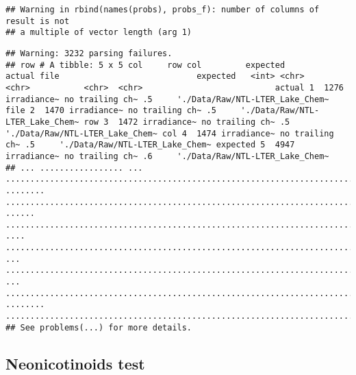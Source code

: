 \documentclass[]{article}
\newenvironment{Shaded}{\begin{snugshade}}{\end{snugshade}}
\newcommand{\KeywordTok}[1]{\textcolor[rgb]{0.13,0.29,0.53}{\textbf{#1}}}
\newcommand{\DataTypeTok}[1]{\textcolor[rgb]{0.13,0.29,0.53}{#1}}
\newcommand{\DecValTok}[1]{\textcolor[rgb]{0.00,0.00,0.81}{#1}}
\newcommand{\StringTok}[1]{\textcolor[rgb]{0.31,0.60,0.02}{#1}}
\newcommand{\CommentTok}[1]{\textcolor[rgb]{0.56,0.35,0.01}{\textit{#1}}}
\newcommand{\OperatorTok}[1]{\textcolor[rgb]{0.81,0.36,0.00}{\textbf{#1}}}
\newcommand{\NormalTok}[1]{#1}
\begin{document}
\begin{verbatim}
## Warning in rbind(names(probs), probs_f): number of columns of result is not
## a multiple of vector length (arg 1)
\end{verbatim}

\begin{verbatim}
## Warning: 3232 parsing failures.
## row # A tibble: 5 x 5 col     row col         expected        actual file                            expected   <int> <chr>       <chr>           <chr>  <chr>                           actual 1  1276 irradiance~ no trailing ch~ .5     './Data/Raw/NTL-LTER_Lake_Chem~ file 2  1470 irradiance~ no trailing ch~ .5     './Data/Raw/NTL-LTER_Lake_Chem~ row 3  1472 irradiance~ no trailing ch~ .5     './Data/Raw/NTL-LTER_Lake_Chem~ col 4  1474 irradiance~ no trailing ch~ .5     './Data/Raw/NTL-LTER_Lake_Chem~ expected 5  4947 irradiance~ no trailing ch~ .6     './Data/Raw/NTL-LTER_Lake_Chem~
## ... ................. ... .......................................................................... ........ .......................................................................... ...... .......................................................................... .... .......................................................................... ... .......................................................................... ... .......................................................................... ........ ..........................................................................
## See problems(...) for more details.
\end{verbatim}

\begin{Shaded}
\end{Shaded}

\subsection{Neonicotinoids test}\label{neonicotinoids-test}
\end{document}
